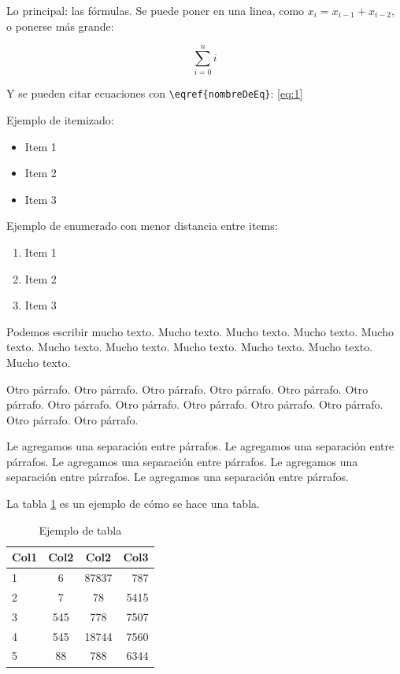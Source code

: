 \documentclass[10pt,a4paper]{article}
\begin{document}
Lo principal: las fórmulas. Se puede poner en una linea, como $x_i = x_{i-1} + x_{i-2}$, o ponerse más grande:

\begin{equation}
	\sum\limits_{i=0}^{n} i
	\label{eq:1}
\end{equation}

Y se pueden citar ecuaciones con \verb|\eqref{nombreDeEq}|: \eqref{eq:1}

Ejemplo de itemizado:

\begin{itemize}
	\item Item 1
	\item Item 2
	\item Item 3
\end{itemize}

Ejemplo de enumerado con menor distancia entre items:

\begin{enumerate} \setlength\itemsep{0cm}
	\item Item 1
	\item Item 2
	\item Item 3
\end{enumerate}

Podemos escribir mucho texto. Mucho texto. Mucho texto. Mucho texto. Mucho texto. Mucho texto. Mucho texto. Mucho texto. Mucho texto. Mucho texto. Mucho texto.

Otro párrafo. Otro párrafo. Otro párrafo. Otro párrafo. Otro párrafo. Otro párrafo. Otro párrafo. Otro párrafo. Otro párrafo. Otro párrafo. Otro párrafo. Otro párrafo. Otro párrafo.

\vspace{0.3cm}

Le agregamos una separación entre párrafos. Le agregamos una separación entre párrafos. Le agregamos una separación entre párrafos. Le agregamos una separación entre párrafos. Le agregamos una separación entre párrafos.

\vspace{0.3cm}

La tabla \ref{tab:ejemplo} es un ejemplo de cómo se hace una tabla.

\begin{table}[h!]
	\centering
	\begin{tabular}{||l c c r||} 
		\hline
		Col1 & Col2 & Col2 & Col3 \\ [0.5ex] 
		\hline\hline
		1 & 6 & 87837 & 787 \\ 
		2 & 7 & 78 & 5415 \\
		3 & 545 & 778 & 7507 \\
		4 & 545 & 18744 & 7560 \\
		5 & 88 & 788 & 6344 \\
		\hline
	\end{tabular}
	\caption{Ejemplo de tabla}
	\label{tab:ejemplo}
\end{table}
\end{document}
